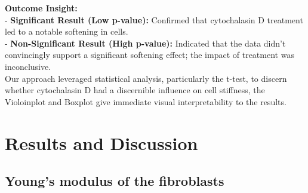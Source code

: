 \documentclass[a4paper,english,12pt,bibliography=totoc]{scrreprt}
\begin{document}
\textbf{Outcome Insight:}\\
- \textbf{Significant Result (Low p-value):} Confirmed that cytochalasin D treatment led to a notable softening in cells.\\
- \textbf{Non-Significant Result (High p-value):} Indicated that the data didn't convincingly support a significant softening effect; the impact of treatment was inconclusive.\\

Our approach leveraged statistical analysis, particularly the t-test, to discern whether cytochalasin D had a discernible influence on cell stiffness, the Violoinplot and Boxplot give immediate visual interpretability to the results.

\chapter{Results and Discussion}
\label{cha:ResandDisc}






\section{Young's modulus of the fibroblasts}
\label{subsec:cutoffval}


\end{document}
